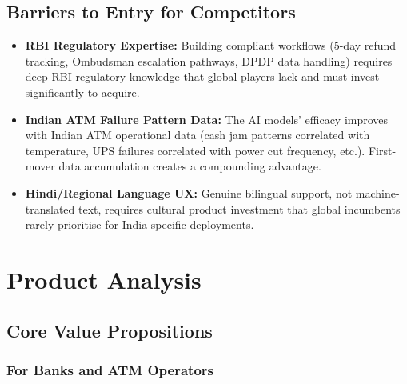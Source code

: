 \documentclass[12pt,a4paper]{article}
\begin{document}
\subsection{Barriers to Entry for Competitors}

\begin{itemize}
  \item \textbf{RBI Regulatory Expertise:} Building compliant workflows (5-day refund tracking,
        Ombudsman escalation pathways, DPDP data handling) requires deep RBI regulatory knowledge
        that global players lack and must invest significantly to acquire.
  \item \textbf{Indian ATM Failure Pattern Data:} The AI models' efficacy improves with Indian
        ATM operational data (cash jam patterns correlated with temperature, UPS failures
        correlated with power cut frequency, etc.). First-mover data accumulation creates a
        compounding advantage.
  \item \textbf{Hindi/Regional Language UX:} Genuine bilingual support, not machine-translated
        text, requires cultural product investment that global incumbents rarely prioritise for
        India-specific deployments.
\end{itemize}

\newpage

\section{Product Analysis}

\subsection{Core Value Propositions}

\subsubsection{For Banks and ATM Operators}
\end{document}
